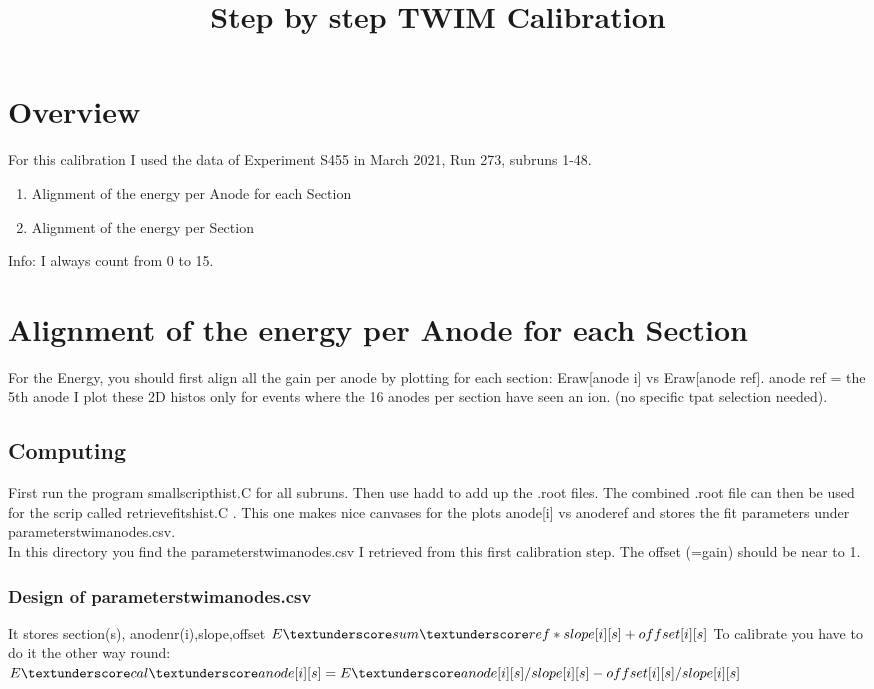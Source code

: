 \documentclass{report}
\title{Step by step TWIM Calibration}
\begin{document}
\maketitle

\section{Overview}
For this calibration I used the data of Experiment S455 in March 2021, Run 273, subruns 1-48.
\begin{enumerate}
	\item Alignment of the energy per Anode for each Section
	\item Alignment of the energy per Section
\end{enumerate}
Info: I always count from 0 to 15.

\section{Alignment of the energy per Anode for each Section}
For the Energy, you should first align all the gain per anode by plotting for each section:\newline 
Eraw[anode i] vs Eraw[anode ref].\newline
anode ref = the 5th anode\newline
I plot these 2D histos only for events where the 16 anodes per section have seen an ion. (no specific tpat selection needed).
\subsection{Computing}
First run the program \dq small\textunderscore script\textunderscore hist.C\dq{} for all subruns. Then use \dq hadd\dq{} to add up the .root
files. The combined .root file can then be used for the scrip called \dq retrieve\textunderscore fits\textunderscore hist.C \dq{}. This one makes nice canvases for the plots anode[i] vs anode\textunderscore ref and stores the fit parameters under 
parameters\textunderscore twim\textunderscore anodes.csv.\\
In this directory you find the parameters\textunderscore twim\textunderscore anodes.csv I retrieved from this first calibration step. The offset (=gain) should be near to 1.\newline
\subsubsection{Design of parameters\textunderscore twim\textunderscore anodes.csv}
It stores section(s), anodenr(i),slope,offset\newline
$E\textunderscore sum\textunderscore ref*slope[i][s] + offset[i][s]$\newline
To calibrate you have to do it the other way round:\newline
$E\textunderscore cal\textunderscore anode[i][s] = E\textunderscore anode[i][s]/slope[i][s] -offset[i][s]/slope[i][s]$
\end{document}
